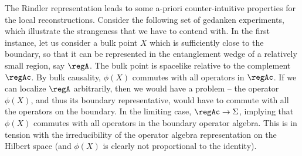 \documentclass[12pt,openany]{book}
\begin{document}
The Rindler representation leads to some a-priori counter-intuitive  properties for the local reconstructions.
Consider the following set of gedanken experiments, which illustrate the strangeness that we have to contend with.
In the first instance, let us consider a bulk point $X$ which is sufficiently close to the boundary, so that it can be represented in the entanglement wedge of a  relatively small region, say $\regA$. The bulk point is spacelike relative to the complement $\regAc$. By bulk causality, $\phi(X)$ commutes with all operators in $\regAc$. If we can localize $\regA$ arbitrarily, then we would have a problem -- the operator $\phi(X)$, and thus its boundary representative, would have to commute with all the operators on the boundary. In the limiting case, $\regAc \to \Sigma$, implying that $\phi(X)$ commutes with all operators in the boundary operator algebra. This  is in tension with the irreducibility of the operator algebra representation on the Hilbert space (and $\phi(X)$ is clearly not proportional to the identity).
\end{document}

